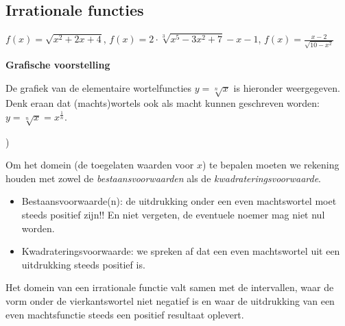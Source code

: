 \subsection{Irrationale functies}

\begin{voorbeeld}
	$f(x)=\sqrt{x^{2}+2x+4}$, $f(x)=2\cdot \sqrt[3]{x^{5}-3x^{2}+7}-x-1$,
$f(x)=\frac{x-2}{\sqrt{10-x^{2}}}$
\end{voorbeeld}

\textbf{Grafische voorstelling}

De grafiek van de elementaire wortelfuncties $y=\sqrt[n]{x}$
is hieronder weergegeven. Denk eraan dat (machts)wortels ook als macht
kunnen geschreven worden: $y=\sqrt[n]{x}=x^{\frac{1}{n}}$.


\begin{figure}[h]
		
\end{figure})

Om het domein (de toegelaten waarden voor $x$) te bepalen moeten
we rekening houden met zowel de \emph{bestaansvoorwaarden} als de
\emph{kwadrateringsvoorwaarde}.

\begin{itemize}
	\item Bestaansvoorwaarde(n): de uitdrukking onder een even machtswortel
moet steeds positief zijn!! En niet vergeten, de eventuele noemer
mag niet nul worden.
\item Kwadrateringsvoorwaarde: we spreken af dat een even machtswortel uit
een uitdrukking steeds positief is.
\end{itemize}

Het domein van een irrationale functie valt samen met de intervallen,
waar de vorm onder de vierkantswortel niet negatief is en waar de
uitdrukking van een even machtsfunctie steeds een positief resultaat
oplevert.

